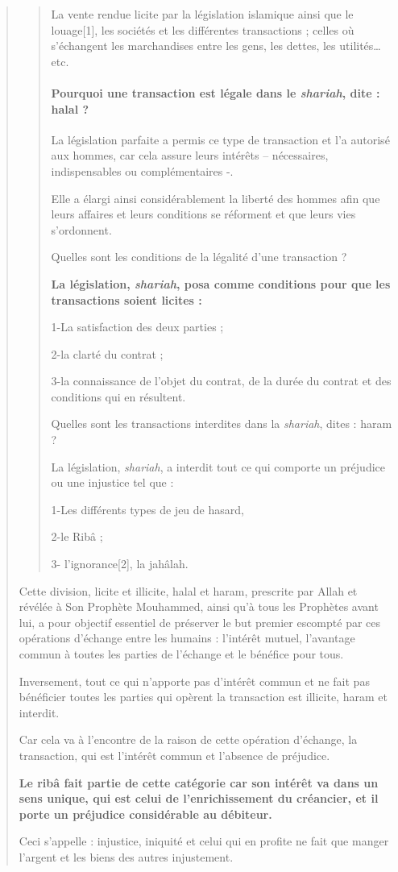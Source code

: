 \begin{quote}
\begin{quote}
La vente rendue licite par la législation islamique ainsi que le louage[1], les sociétés et les différentes transactions ; celles où s’échangent les marchandises entre les gens, les dettes, les utilités… etc.

\paragraph{Pourquoi une transaction est légale dans le \emph{shariah}, dite : halal ?}

La législation parfaite a permis ce type de transaction et l’a autorisé aux hommes, car cela assure leurs intérêts – nécessaires, indispensables ou complémentaires -.

Elle a élargi ainsi considérablement la liberté des hommes afin que leurs affaires et leurs conditions se réforment et que leurs vies s’ordonnent.

Quelles sont les conditions de la légalité d’une transaction ?

\textbf{La législation, \emph{shariah}, posa comme conditions pour que les transactions soient licites :}

1-La satisfaction des deux parties ;

2-la clarté du contrat ;

3-la connaissance de l’objet du contrat, de la durée du contrat et des conditions qui en résultent.



Quelles sont les transactions interdites dans la \emph{shariah}, dites : haram ?

La législation, \emph{shariah}, a interdit tout ce qui comporte un préjudice ou une injustice tel que :

1-Les différents types de jeu de hasard,

2-le Ribâ ;

3- l’ignorance[2], la jahâlah.
\end{quote}
 

Cette division, licite et illicite, halal et haram, prescrite par Allah et révélée à Son Prophète Mouhammed, ainsi qu’à tous les Prophètes avant lui, a pour objectif essentiel de préserver le but premier escompté par ces opérations d’échange entre les humains : l’intérêt mutuel, l’avantage commun à toutes les parties de l’échange et le bénéfice pour tous.

Inversement, tout ce qui n’apporte pas d’intérêt commun et ne fait pas bénéficier toutes les parties qui opèrent la transaction est illicite, haram et interdit.

Car cela va à l’encontre de la raison de cette opération d’échange, la transaction, qui est l’intérêt commun et l’absence de préjudice.

\textbf{Le ribâ fait partie de cette catégorie car son intérêt va dans un sens unique, qui est celui de l’enrichissement du créancier, et il porte un préjudice considérable au débiteur.}

Ceci s’appelle : injustice, iniquité et celui qui en profite ne fait que manger l’argent et les biens des autres injustement.
 \end{quote}
 
